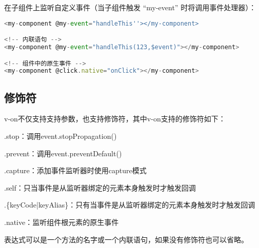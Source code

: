 在子组件上监听自定义事件（当子组件触发 “my-event” 时将调用事件处理器）：

\begin{lstlisting}[language=JavaScript]
<my-component @my-event="handleThis''></my-component>

<!-- 内联语句 -->
<my-component @my-event="handleThis(123,$event)"></my-component>

<!-- 组件中的原生事件 -->
<my-component @click.native="onClick"></my-component>
\end{lstlisting}


\subsection{修饰符}


v-on不仅支持支持参数，也支持修饰符，其中v-on支持的修饰符如下：


\begin{compactitem}
\item .stop：调用event.stopPropagation()
\item .prevent：调用event.preventDefault()
\item .capture：添加事件监听器时使用capture模式
\item .self：只当事件是从监听器绑定的元素本身触发时才触发回调
\item .\{keyCode|keyAlias\}：只有当事件是从监听器绑定的元素本身触发时才触发回调
\item .native：监听组件根元素的原生事件
\end{compactitem}

表达式可以是一个方法的名字或一个内联语句，如果没有修饰符也可以省略。






\begin{lstlisting}[language=JavaScript]

\end{lstlisting}




\begin{lstlisting}[language=JavaScript]

\end{lstlisting}




\begin{lstlisting}[language=JavaScript]

\end{lstlisting}




